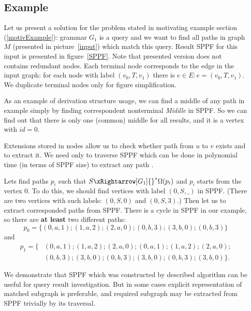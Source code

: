 \subsection{Example}

Let us present a solution for the problem stated in motivating example section (\ref{motivExample}): grammar $G_1$ is a query and we want to find all paths in graph $M$ (presented in picture~\ref{input}) which match this query.
Result SPPF for this input is presented in figure~\ref{SPPF}. Note that presented version does not contains redundant nodes.
Each terminal node corresponds to the edge in the input graph: for each node with label $(v_0, T, v_1)$ there is $e\in E: e=(v_0,T,v_1)$.
We duplicate terminal nodes only for figure simplification.


    
As an example of derivation structure usage, we can find a middle of any path in example simply by finding correspondent nonterminal \textit{Middle} in SPPF.
So we can find out that there is only one (common) middle for all results, and it is a vertex with $id = 0$. 

Extensions stored in nodes allow us to check whether path from $u$ to $v$ exists and to extract it. 
We need only to traverse SPPF which can be done in polynomial time (in terms of SPPF size) to extract any path . 

Lets find paths $p_i$ such that $S {\xRightarrow[G_1]{}}^{*} \Omega(p_i)$ and $p_i$ starts from the vertex $0$.
To do this, we should find vertices with label $(0, S, \_)$ in SPPF.
(There are two vertices with such labels: $(0, S, 0)$ and $(0, S, 3)$.)
Then let us to extract corresponded paths from SPPF.
There is a cycle in SPPF in our example, so there are \textbf{at least} two different paths: $$p_0=\{(0,a,1);(1,a,2);(2,a,0);(0,b,3);(3,b,0);(0,b,3)\}$$ and 
\begin{align*}
p_1=\{&(0,a,1);(1,a,2);(2,a,0);(0,a,1);(1,a,2);(2,a,0);\\ &(0,b,3);(3,b,0);(0,b,3);(3,b,0);(0,b,3);(3,b,0)\}.
\end{align*}


We demonstrate that SPPF which was constructed by described algorithm can be useful for query result investigation. 
But in some cases explicit representation of matched subgraph is preferable, and required subgraph may be extracted from SPPF trivially by its traversal.
